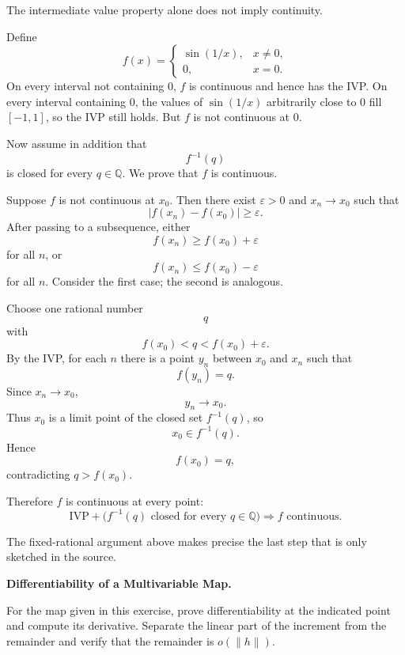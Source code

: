 \begin{solution}
The intermediate value property alone does not imply continuity.

Define
\[
f(x)=
\begin{cases}
\sin(1/x),&x\neq0,\\
0,&x=0.
\end{cases}
\]
On every interval not containing \(0\), \(f\) is continuous and hence has the IVP. On every
interval containing \(0\), the values of \(\sin(1/x)\) arbitrarily close to \(0\) fill
\([-1,1]\), so the IVP still holds. But \(f\) is not continuous at \(0\).

Now assume in addition that
\[
f^{-1}(q)
\]
is closed for every \(q\in\mathbb Q\). We prove that \(f\) is continuous.

Suppose \(f\) is not continuous at \(x_0\). Then there exist \(\varepsilon>0\) and
\(x_n\to x_0\) such that
\[
|f(x_n)-f(x_0)|\ge\varepsilon.
\]
After passing to a subsequence, either
\[
f(x_n)\ge f(x_0)+\varepsilon
\]
for all \(n\), or
\[
f(x_n)\le f(x_0)-\varepsilon
\]
for all \(n\). Consider the first case; the second is analogous.

Choose one rational number
\[
q
\]
with
\[
f(x_0)<q<f(x_0)+\varepsilon.
\]
By the IVP, for each \(n\) there is a point \(y_n\) between \(x_0\) and \(x_n\) such that
\[
f(y_n)=q.
\]
Since \(x_n\to x_0\),
\[
y_n\to x_0.
\]
Thus \(x_0\) is a limit point of the closed set \(f^{-1}(q)\), so
\[
x_0\in f^{-1}(q).
\]
Hence
\[
f(x_0)=q,
\]
contradicting \(q>f(x_0)\).

Therefore \(f\) is continuous at every point:
\[
\boxed{
\text{IVP}+\bigl(f^{-1}(q)\text{ closed for every }q\in\mathbb Q\bigr)
\Longrightarrow
f\text{ continuous}.
}
\]

The fixed-rational argument above makes precise the last step that is only sketched in the
source.
\end{solution}


\begin{problem}[CP-II-0436]
\label{prob:cp-ii-0436}
\textbf{Differentiability of a Multivariable Map.}

\hspace*{1.5em}For the map given in this exercise, prove differentiability at the indicated
point and compute its derivative. Separate the linear part of the increment
from the remainder and verify that the remainder is \(o(\|h\|)\).
\end{problem}

